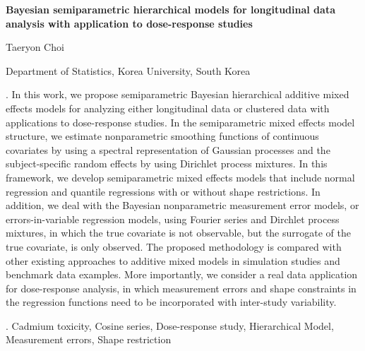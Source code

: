 \documentclass[12pt]{article}
\begin{document}
\begin{flushleft}


{\LARGE\bf Bayesian semiparametric hierarchical models for longitudinal data analysis with application to dose-response studies}


\vspace{1.0cm}

Taeryon Choi

\begin{description}

\item Department of Statistics, Korea University, South Korea

\end{description}

\end{flushleft}


\vspace{0.75cm}

.
In this work, we propose semiparametric Bayesian hierarchical additive mixed effects models for analyzing either longitudinal data or clustered data with applications to dose-response studies. In the semiparametric mixed effects model structure, we estimate nonparametric smoothing functions of continuous covariates by using a spectral representation of Gaussian processes and the subject-specific random effects by using Dirichlet process mixtures. In this framework, we develop semiparametric mixed effects models that include normal regression and quantile regressions with or without shape restrictions. In addition, we deal with the Bayesian nonparametric measurement error models, or errors-in-variable regression models, using Fourier series and Dirchlet process mixtures, in which the true covariate is not observable, but the surrogate of the true covariate, is only observed. The proposed methodology is compared with other existing approaches to additive mixed models in simulation studies and benchmark data examples. More importantly, we consider a real data application for dose-response analysis, in which measurement errors and shape constraints in the regression functions need to be incorporated with inter-study variability. 

\vskip 2mm

.
Cadmium toxicity, Cosine series, Dose-response study, Hierarchical Model, Measurement errors, Shape restriction
\end{document}
